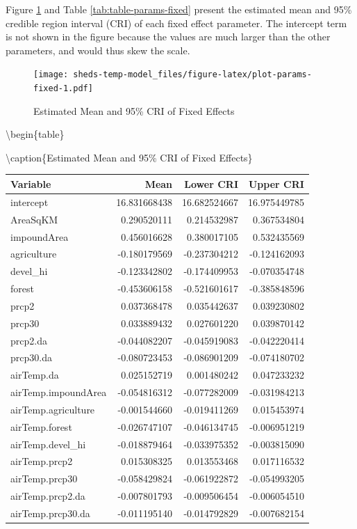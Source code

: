 \documentclass[
]{book}
\begin{document}
Figure \ref{fig:plot-params-fixed} and Table \ref{tab:table-params-fixed} present the estimated mean and 95\% credible region interval (CRI) of each fixed effect parameter. The intercept term is not shown in the figure because the values are much larger than the other parameters, and would thus skew the scale.

\begin{figure}
\centering
\texttt{[image: sheds-temp-model\_files/figure-latex/plot-params-fixed-1.pdf]}
\caption{\label{fig:plot-params-fixed}Estimated Mean and 95\% CRI of Fixed Effects}
\end{figure}

\textbackslash begin\{table\}

\textbackslash caption\{\label{tab:table-params-fixed}Estimated Mean and 95\% CRI of Fixed Effects\}
\centering

\begin{tabular}[t]{l|r|r|r}
\hline
Variable & Mean & Lower CRI & Upper CRI\\
\hline
intercept & 16.831668438 & 16.682524667 & 16.975449785\\
\hline
AreaSqKM & 0.290520111 & 0.214532987 & 0.367534804\\
\hline
impoundArea & 0.456016628 & 0.380017105 & 0.532435569\\
\hline
agriculture & -0.180179569 & -0.237304212 & -0.124162093\\
\hline
devel\_hi & -0.123342802 & -0.174409953 & -0.070354748\\
\hline
forest & -0.453606158 & -0.521601617 & -0.385848596\\
\hline
prcp2 & 0.037368478 & 0.035442637 & 0.039230802\\
\hline
prcp30 & 0.033889432 & 0.027601220 & 0.039870142\\
\hline
prcp2.da & -0.044082207 & -0.045919083 & -0.042220414\\
\hline
prcp30.da & -0.080723453 & -0.086901209 & -0.074180702\\
\hline
airTemp.da & 0.025152719 & 0.001480242 & 0.047233232\\
\hline
airTemp.impoundArea & -0.054816312 & -0.077282009 & -0.031984213\\
\hline
airTemp.agriculture & -0.001544660 & -0.019411269 & 0.015453974\\
\hline
airTemp.forest & -0.026747107 & -0.046134745 & -0.006951219\\
\hline
airTemp.devel\_hi & -0.018879464 & -0.033975352 & -0.003815090\\
\hline
airTemp.prcp2 & 0.015308325 & 0.013553468 & 0.017116532\\
\hline
airTemp.prcp30 & -0.058429824 & -0.061922872 & -0.054993205\\
\hline
airTemp.prcp2.da & -0.007801793 & -0.009506454 & -0.006054510\\
\hline
airTemp.prcp30.da & -0.011195140 & -0.014792829 & -0.007682154\\
\hline
\end{tabular}
\end{document}
